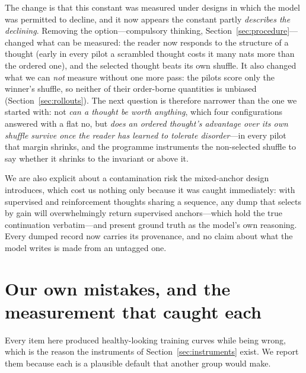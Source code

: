 \documentclass{article} %
\begin{document}
The change is that this constant was measured under designs in which the model was permitted to decline, and it now appears the constant partly \emph{describes the declining}. Removing the option---compulsory thinking, Section~\ref{sec:procedure}---changed what can be measured: the reader now responds to the structure of a thought (early in every pilot a scrambled thought costs it many nats more than the ordered one), and the selected thought beats its own shuffle. It also changed what we can \emph{not} measure without one more pass: the pilots score only the winner's shuffle, so neither of their order-borne quantities is unbiased (Section~\ref{sec:rollouts}). The next question is therefore narrower than the one we started with: not \emph{can a thought be worth anything}, which four configurations answered with a flat no, but \emph{does an ordered thought's advantage over its own shuffle survive once the reader has learned to tolerate disorder}---in every pilot that margin shrinks, and the programme instruments the non-selected shuffle to say whether it shrinks to the invariant or above it.

We are also explicit about a contamination risk the mixed-anchor design introduces, which cost us nothing only because it was caught immediately: with supervised and reinforcement thoughts sharing a sequence, any dump that selects by gain will overwhelmingly return supervised anchors---which hold the true continuation verbatim---and present ground truth as the model's own reasoning. Every dumped record now carries its provenance, and no claim about what the model writes is made from an untagged one.


\section{Our own mistakes, and the measurement that caught each}
\label{sec:mistakes}

Every item here produced healthy-looking training curves while being wrong, which is the reason the instruments of Section~\ref{sec:instruments} exist. We report them because each is a plausible default that another group would make.
\end{document}
